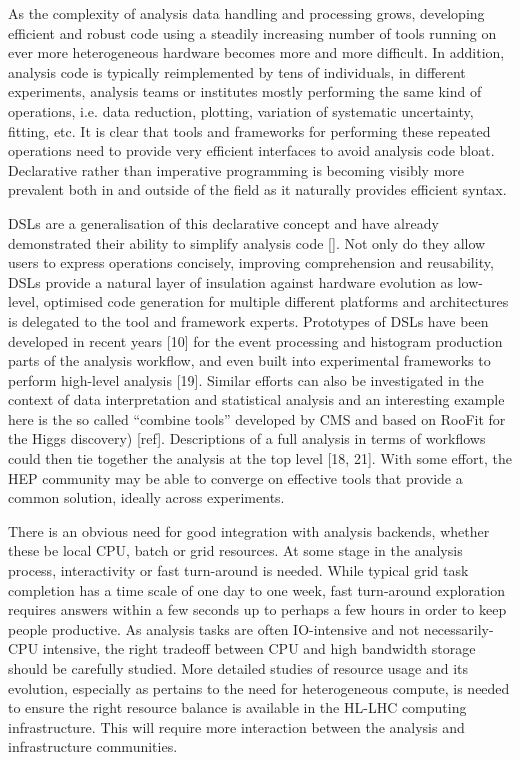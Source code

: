 \documentclass[11pt,a4paper]{article}
\begin{document}
As the complexity of analysis data handling and processing grows,
developing efficient and robust code using a steadily increasing number
of tools running on ever more heterogeneous hardware becomes more and
more difficult. In addition, analysis code is typically reimplemented by
tens of individuals, in different experiments, analysis teams or
institutes mostly performing the same kind of operations, i.e. data
reduction, plotting, variation of systematic uncertainty, fitting, etc.
It is clear that tools and frameworks for performing these repeated
operations need to provide very efficient interfaces to avoid analysis
code bloat. Declarative rather than imperative programming is becoming
visibly more prevalent both in and outside of the field as it naturally
provides efficient syntax.

DSLs are a generalisation of this declarative concept and have already
demonstrated their ability to simplify analysis code {[}{]}. Not only do
they allow users to express operations concisely, improving
comprehension and reusability, DSLs provide a natural layer of
insulation against hardware evolution as low-level, optimised code
generation for multiple different platforms and architectures is
delegated to the tool and framework experts. Prototypes of DSLs have
been developed in recent years {[}10{]} for the event processing and
histogram production parts of the analysis workflow, and even built into
experimental frameworks to perform high-level analysis {[}19{]}. Similar
efforts can also be investigated in the context of data interpretation
and statistical analysis and an interesting example here is the so
called ``combine tools'' developed by CMS and based on RooFit for the
Higgs discovery) {[}ref{]}. Descriptions of a full analysis in terms of
workflows could then tie together the analysis at the top level {[}18,
21{]}. With some effort, the HEP community may be able to converge on
effective tools that provide a common solution, ideally across
experiments.

There is an obvious need for good integration with analysis backends,
whether these be local CPU, batch or grid resources. At some stage in
the analysis process, interactivity or fast turn-around is needed. While
typical grid task completion has a time scale of one day to one week,
fast turn-around exploration requires answers within a few seconds up to
perhaps a few hours in order to keep people productive. As analysis
tasks are often IO-intensive and not necessarily-CPU intensive, the
right tradeoff between CPU and high bandwidth storage should be
carefully studied. More detailed studies of resource usage and its
evolution, especially as pertains to the need for heterogeneous compute,
is needed to ensure the right resource balance is available in the
HL-LHC computing infrastructure. This will require more interaction
between the analysis and infrastructure communities.
\end{document}

